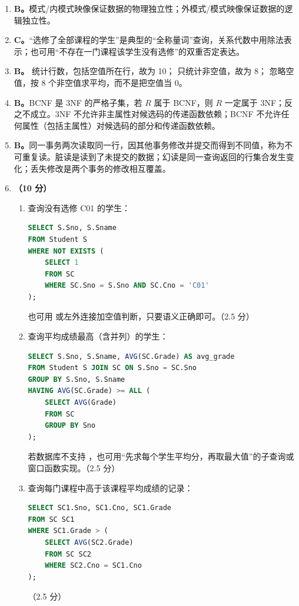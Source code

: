 \documentclass[a4paper,11pt]{article}
\begin{document}
\begin{enumerate}[start=21, label=\textbf{\arabic*.}, leftmargin=2.4em, itemsep=0.45em]

\item \textbf{B。}模式/内模式映像保证数据的物理独立性；外模式/模式映像保证数据的逻辑独立性。

\item \textbf{C。}“选修了全部课程的学生”是典型的“全称量词”查询，关系代数中用除法表示；也可用“不存在一门课程该学生没有选修”的双重否定表达。

\item \textbf{B。} 统计行数，包括空值所在行，故为 10； 只统计非空值，故为 8； 忽略空值，按 8 个非空值求平均，而不是把空值当 0。

\item \textbf{B。}BCNF 是 3NF 的严格子集，若 $R$ 属于 BCNF，则 $R$ 一定属于 3NF；反之不成立。3NF 不允许非主属性对候选码的传递函数依赖；BCNF 不允许任何属性（包括主属性）对候选码的部分和传递函数依赖。

\item \textbf{B。}同一事务两次读取同一行，因其他事务修改并提交而得到不同值，称为不可重复读。脏读是读到了未提交的数据；幻读是同一查询返回的行集合发生变化；丢失修改是两个事务的修改相互覆盖。

\item \textbf{（10 分）}
\begin{enumerate}[label=（\arabic*）, leftmargin=2.2em, itemsep=2pt]
  \item 查询没有选修 C01 的学生：
\begin{lstlisting}[language=SQL]
SELECT S.Sno, S.Sname
FROM Student S
WHERE NOT EXISTS (
    SELECT 1
    FROM SC
    WHERE SC.Sno = S.Sno AND SC.Cno = 'C01'
);
\end{lstlisting}
也可用  或左外连接加空值判断，只要语义正确即可。\hfill（2.5 分）

  \item 查询平均成绩最高（含并列）的学生：
\begin{lstlisting}[language=SQL]
SELECT S.Sno, S.Sname, AVG(SC.Grade) AS avg_grade
FROM Student S JOIN SC ON S.Sno = SC.Sno
GROUP BY S.Sno, S.Sname
HAVING AVG(SC.Grade) >= ALL (
    SELECT AVG(Grade)
    FROM SC
    GROUP BY Sno
);
\end{lstlisting}
若数据库不支持 ，也可用“先求每个学生平均分，再取最大值”的子查询或窗口函数实现。\hfill（2.5 分）

  \item 查询每门课程中高于该课程平均成绩的记录：
\begin{lstlisting}[language=SQL]
SELECT SC1.Sno, SC1.Cno, SC1.Grade
FROM SC SC1
WHERE SC1.Grade > (
    SELECT AVG(SC2.Grade)
    FROM SC SC2
    WHERE SC2.Cno = SC1.Cno
);
\end{lstlisting}
\hfill（2.5 分）


\end{enumerate}
\end{enumerate}
\end{document}
